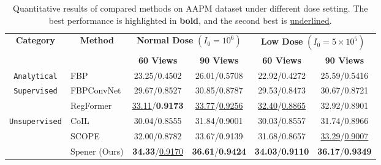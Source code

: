 \begin{table*}
\centering

\begin{tabular}{clcccc} 
\toprule
\multirow{2.5}{*}{\textbf{Category}} & \multicolumn{1}{c}{\multirow{2.5}{*}{\textbf{Method}}} & \multicolumn{2}{c}{\textbf{Normal Dose} $(I_0 = 10^6)$} & \multicolumn{2}{c}{\textbf{Low Dose} $(I_0 = 5\times10^5)$}  \\ 
\cmidrule(lr){3-4} \cmidrule(lr){5-6}
                                   & \multicolumn{1}{c}{}                                 & \textbf{60 Views}    & \textbf{90 Views}                                         & \textbf{60 Views} & \textbf{90 Views}                                                \\ 
\midrule
\texttt{Analytical}                      & FBP                                                  &  23.25/0.4502           & 26.01/0.5708                                                & 22.92/0.4272        & 25.59/0.5416                                                       \\ 
\midrule
\multirow{2}{*}{\texttt{Supervised}}        & FBPConvNet                                           & 29.67/0.8527 & 30.85/0.8787                                      &  29.53/0.8473        &   30.67/0.8721                                                       \\
                                   & RegFormer                                            &      \underline{33.11}/\textbf{0.9173}       &    \underline{33.77}/\underline{0.9256}                                              &   \underline{32.40}/\underline{0.8865}       &    32.92/0.8901                                                      \\ 
\midrule
\multirow{3}{*}{\texttt{Unsupervised}}      & CoIL                                                 &    30.04/0.8555         &     31.84/0.9001                                            &   30.03/0.8557        &        31.74/0.8966                                                  \\
                                   & SCOPE                                                & 32.00/0.8782             & 33.67/0.9139                                                 &    31.68/0.8657      &  \underline{33.29}/\underline{0.9007}                                                        \\
                                   & Spener (Ours)                                               &   \textbf{34.33}/\underline{0.9170}          &      \textbf{36.61}/\textbf{0.9424}                                            &  \textbf{34.03}/\textbf{0.9110}        &    \textbf{36.17}/\textbf{0.9349}                                                      \\
\bottomrule
\end{tabular}
\caption{Quantitative results of compared methods on AAPM dataset under different dose setting. The best performance is highlighted in \textbf{bold}, and the second best is \underline{underlined}.}
\label{table2}
\end{table*}